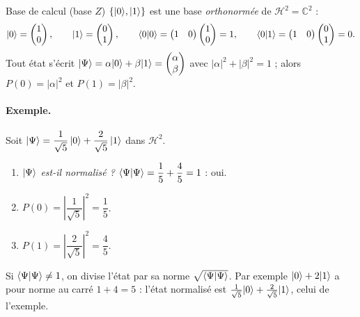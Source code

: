 \begin{definition}{Base de calcul (base $Z$)}
$\{|0\rangle,|1\rangle\}$ est une base \emph{orthonormée} de $\mathcal{H}^2=\mathbb{C}^2$ :
\[
  |0\rangle=\begin{pmatrix}1\\ 0\end{pmatrix},\qquad
  |1\rangle=\begin{pmatrix}0\\ 1\end{pmatrix},\qquad
  \langle 0|0\rangle=\begin{pmatrix}1 & 0\end{pmatrix}\begin{pmatrix}1\\ 0\end{pmatrix}=1,\qquad
  \langle 0|1\rangle=\begin{pmatrix}1 & 0\end{pmatrix}\begin{pmatrix}0\\ 1\end{pmatrix}=0 .
\]
Tout état s'écrit $|\Psi\rangle=\alpha|0\rangle+\beta|1\rangle=\begin{pmatrix}\alpha\\ \beta\end{pmatrix}$
avec $|\alpha|^2+|\beta|^2=1$ ; alors $P(0)=|\alpha|^2$ et $P(1)=|\beta|^2$.
\end{definition}

\paragraph{Exemple.} Soit $|\Psi\rangle=\dfrac{1}{\sqrt5}\,|0\rangle+\dfrac{2}{\sqrt5}\,|1\rangle$
dans $\mathcal{H}^2$.
\begin{enumerate}[nosep]
  \item \emph{$|\Psi\rangle$ est-il normalisé ?}
        $\langle \Psi|\Psi\rangle=\dfrac15+\dfrac45=1$ : oui.
  \item $P(0)=\left|\dfrac{1}{\sqrt5}\right|^2=\dfrac15$.
  \item $P(1)=\left|\dfrac{2}{\sqrt5}\right|^2=\dfrac45$.
\end{enumerate}

\begin{remarque}
Si $\langle \Psi|\Psi\rangle\neq1$, on divise l'état par sa norme $\sqrt{\langle \Psi|\Psi\rangle}$.
Par exemple $|0\rangle+2|1\rangle$ a pour norme au carré $1+4=5$ : l'état normalisé est
$\frac{1}{\sqrt5}|0\rangle+\frac{2}{\sqrt5}|1\rangle$, celui de l'exemple.
\end{remarque}

